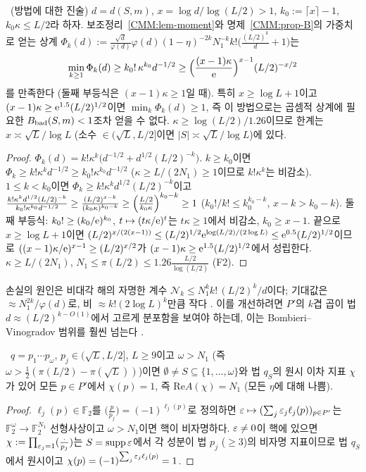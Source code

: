 \begin{proposition}\label{CMM:prop-barrier}
\PROVED\ (방법에 대한 진술) $d=d(S,m)$, $x=\log d/\log(L/2)>1$, $k_0:=\lceil x\rceil-1$, $k_0\kappa\le L/2$라 하자. 보조정리~\ref{CMM:lem-moment}와
명제~\ref{CMM:prop-B}의 가중치로 얻는 상계 $\Phi_k(d):=\frac{\sqrt d}{\varphi(d)}\varphi(d)(1-\eta)^{-2k}N_1^{-k}k!\bigl(\frac{(L/2)^k}d+1\bigr)$는
\[
\min_{k\ge1}\Phi_k(d)\ge k_0!\,\kappa^{k_0}d^{-1/2}\ge\Bigl(\frac{(x-1)\kappa}{\mathrm{e}}\Bigr)^{x-1}(L/2)^{-x/2}
\]
를 만족한다 (둘째 부등식은 $(x-1)\kappa\ge1$일 때). 특히 $x\ge\log L+1$이고 $(x-1)\kappa\ge\mathrm{e}^{1.5}(L/2)^{1/2}$이면 $\min_k\Phi_k(d)\ge1$,
즉 이 방법으로는 곱셈적 상계에 필요한 $B_{\rm bad}(S,m)<1$조차 얻을 수 없다. $\kappa\ge\log(L/2)/1.26$이므로 한계는 $x\asymp\sqrt L/\log L$ (소수 $\in(\sqrt L,L/2]$이면 $|S|\asymp\sqrt L/\log L$)에 있다.
\end{proposition}
\begin{proof}
$\Phi_k(d)=k!\kappa^k\bigl(d^{-1/2}+d^{1/2}(L/2)^{-k}\bigr)$. $k\ge k_0$이면 $\Phi_k\ge k!\kappa^kd^{-1/2}\ge k_0!\kappa^{k_0}d^{-1/2}$ ($\kappa\ge L/(2N_1)\ge1$이므로 $k!\kappa^k$는 비감소).
$1\le k<k_0$이면 $\Phi_k\ge k!\kappa^kd^{1/2}(L/2)^{-k}$이고
$\frac{k!\kappa^kd^{1/2}(L/2)^{-k}}{k_0!\kappa^{k_0}d^{-1/2}}\ge\frac{(L/2)^{x-k}}{(k_0\kappa)^{k_0-k}}\ge\Bigl(\frac{L/2}{k_0\kappa}\Bigr)^{k_0-k}\ge1$
($k_0!/k!\le k_0^{k_0-k}$, $x-k>k_0-k$). 둘째 부등식: $k_0!\ge(k_0/\mathrm{e})^{k_0}$, $t\mapsto(t\kappa/\mathrm{e})^t$는 $t\kappa\ge1$에서 비감소, $k_0\ge x-1$.
끝으로 $x\ge\log L+1$이면 $(L/2)^{x/(2(x-1))}\le(L/2)^{1/2}\mathrm{e}^{\log(L/2)/(2\log L)}\le\mathrm{e}^{0.5}(L/2)^{1/2}$이므로
$((x-1)\kappa/\mathrm{e})^{x-1}\ge(L/2)^{x/2}$가 $(x-1)\kappa\ge\mathrm{e}^{1.5}(L/2)^{1/2}$에서 성립한다. $\kappa\ge L/(2N_1)$, $N_1\le\pi(L/2)\le1.26\frac{L/2}{\log(L/2)}$ (F2).
\end{proof}
손실의 원인은 비대각 해의 자명한 계수 $\mathcal N_k\le N_1^kk!\,(L/2)^k/d$이다; 기대값은 $\approx N_1^{2k}/\varphi(d)$로, 비 $\approx k!(2\log L)^k$만큼 작다 \HEUR.
이를 개선하려면 $P'$의 $k$겹 곱이 법 $d\approx(L/2)^{k-O(1)}$에서 고르게 분포함을 보여야 하는데, 이는 Bombieri--Vinogradov 범위를 훨씬 넘는다 \HEUR.

\begin{proposition}[나쁜 원시 지표의 존재]\label{CMM:prop-badexist}
\PROVED\ $q=p_1\cdots p_\omega$, $p_j\in(\sqrt L,L/2]$, $L\ge9$이고 $\omega>N_1$ (즉 $\omega>\frac12(\pi(L/2)-\pi(\sqrt L))$)이면
$\emptyset\ne S\subseteq\{1,\dots,\omega\}$와 법 $q_S$의 원시 이차 지표 $\chi$가 있어 모든 $p\in P'$에서 $\chi(p)=1$, 즉 $\mathrm{Re}A(\chi)=N_1$ (모든 $\eta$에 대해 나쁨).
\end{proposition}
\begin{proof}
$\ell_j(p)\in\mathbb F_2$를 $\bigl(\frac p{p_j}\bigr)=(-1)^{\ell_j(p)}$로 정의하면 $\varepsilon\mapsto(\sum_j\varepsilon_j\ell_j(p))_{p\in P'}$는 $\mathbb F_2^\omega\to\mathbb F_2^{N_1}$ 선형사상이고 $\omega>N_1$이면 핵이 비자명하다.
$\varepsilon\ne0$이 핵에 있으면 $\chi:=\prod_{\varepsilon_j=1}(\frac{\cdot}{p_j})$는 $S=\mathrm{supp}\,\varepsilon$에서 각 성분이 법 $p_j$ ($\ge3$)의 비자명 지표이므로 법 $q_S$에서 원시이고 $\chi(p)=(-1)^{\sum_j\varepsilon_j\ell_j(p)}=1$.
\end{proof}


